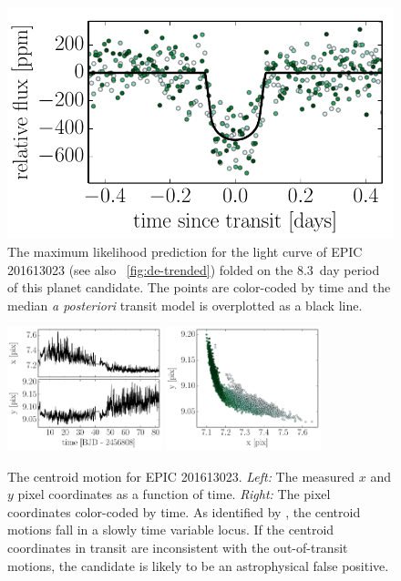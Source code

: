 \documentclass[12pt,preprint]{aastex}
\newcommand{\figref}[1]{\ref{fig:#1}}
\newcommand{\Fig}[1]{\figurename~\figref{#1}}
\newcommand{\fig}[1]{\Fig{#1}}
\newcommand{\figlabel}[1]{\label{fig:#1}}
\begin{document}
\begin{figure}[p]
\begin{center}
\includegraphics{figures/folded.pdf}
\end{center}
\caption{%
The maximum likelihood prediction for the light curve of EPIC 201613023 (see
also \fig{de-trended}) folded on the 8.3~day period of this planet candidate.
The points are color-coded by time and the median \emph{a posteriori} transit
model is overplotted as a black line.
\figlabel{folded}}
\end{figure}

\begin{figure}[p]
\begin{center}
\includegraphics[width=0.4\textwidth]{figures/centroid.pdf}
\includegraphics[width=0.4\textwidth]{figures/centroid-2.pdf}
\end{center}
\caption{%
The centroid motion for EPIC 201613023.
\emph{Left:} The measured $x$ and $y$ pixel coordinates as a function of time.
\emph{Right:} The pixel coordinates color-coded by time.
As identified by \citet{Vanderburg:2014}, the centroid motions fall in a
slowly time variable locus.
If the centroid coordinates in transit are inconsistent with the
out-of-transit motions, the candidate is likely to be an astrophysical false
positive.
\figlabel{centroid}}
\end{figure}
\end{document}
